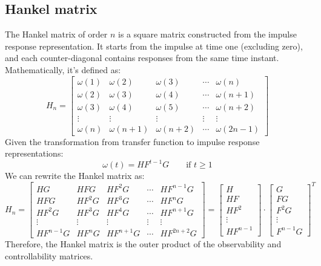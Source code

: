 \subsection{Hankel matrix}
The Hankel matrix of order $n$ is a square matrix constructed from the impulse response representation.
It starts from the impulse at time one (excluding zero), and each counter-diagonal contains responses from the same time instant. 
Mathematically, it's defined as:
\[H_n=\begin{bmatrix} \omega(1) & \omega(2) & \omega(3) & \cdots & \omega(n) \\ \omega(2) & \omega(3) & \omega(4) & \cdots & \omega(n+1) \\ \omega(3) & \omega(4) & \omega(5) & \cdots & \omega(n+2) \\ \vdots & \vdots  & \vdots  & \vdots  & \vdots  \\ \omega(n) & \omega(n+1) & \omega(n+2) & \cdots & \omega(2n-1) \end{bmatrix}\]
Given the transformation from transfer function to impulse response representations:
\[\omega(t)=HF^{t-1}G \qquad \text{if } t \geq 1\]
We can rewrite the Hankel matrix as:
\[H_n=\begin{bmatrix} HG & HFG & HF^2G  & \cdots & HF^{n-1}G \\ HFG & HF^2G & HF^3G  & \cdots & HF^{n}G \\ HF^2G & HF^3G & HF^4G  & \cdots & HF^{n+1}G \\ \vdots & \vdots  & \vdots  & \vdots  & \vdots  \\ HF^{n-1}G & HF^{n}G & HF^{n+1}G  & \cdots & HF^{2n+2}G \end{bmatrix}=\begin{bmatrix} H \\ HF \\ HF^2 \\ \vdots \\ HF^{n-1} \end{bmatrix} \cdot \begin{bmatrix} G \\ FG \\ F^2G \\ \vdots \\ F^{n-1}G \end{bmatrix}^T\]
Therefore, the Hankel matrix is the outer product of the observability and controllability matrices. 